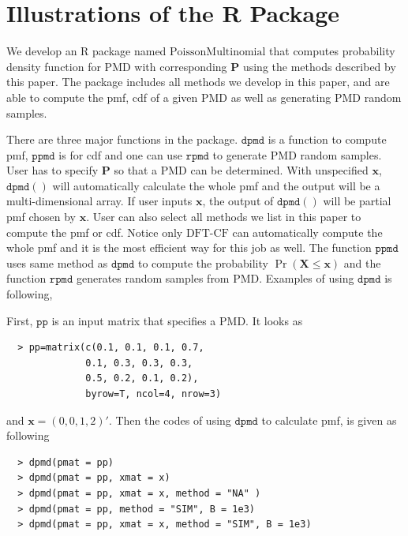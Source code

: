 \documentclass[12pt]{article}
\newcommand{\Pmat}{\mathbf{P}}
\newcommand{\PMD}{\textrm{PMD}}
\newcommand{\Xvec}{\boldsymbol{X}}
\newcommand{\xvec}{\boldsymbol{x}}
\newcommand{\code}{\texttt}
\newcommand{\dft}{{\textrm{DFT-CF}}}
\begin{document}
\section{Illustrations of the R Package}\label{sec:rpackage}
We develop an R package named $\textrm{PoissonMultinomial}$ that computes probability density function for $\PMD$ with corresponding $\Pmat$ using the methods described by this paper. The package includes all methods we develop in this paper, and are able to compute the pmf, cdf of a given $\PMD$ as well as generating $\PMD$ random samples.

There are three major functions in the package. $\code{dpmd}$ is a function to compute pmf, $\code{ppmd}$ is for cdf and one can use $\code{rpmd}$ to generate $\PMD$ random samples. User has to specify $\Pmat$ so that a $\PMD$ can be determined. With unspecified $\xvec$, $\code{dpmd}( )$ will automatically calculate the whole pmf and the output will be a multi-dimensional array. If user inputs $\xvec$, the output of $\code{dpmd}( )$ will be partial pmf chosen by $\xvec$. User can also select all methods we list in this paper to compute the pmf or cdf. Notice only $\dft$ can automatically compute the whole pmf and it is the most efficient way for this job as well. The function $\code{ppmd}$ uses same method as $\code{dpmd}$ to compute the probability $\Pr(\Xvec \leq \xvec)$ and the function $\code{rpmd}$ generates random samples from $\PMD$.  Examples of using $\code{dpmd}$ is following,

First, $\code{pp}$ is an input matrix that specifies a $\PMD$. It looks as
\begin{verbatim}
  > pp=matrix(c(0.1, 0.1, 0.1, 0.7,
              0.1, 0.3, 0.3, 0.3,
              0.5, 0.2, 0.1, 0.2),
              byrow=T, ncol=4, nrow=3)
\end{verbatim}
and $\xvec=(0,0,1,2)'$. Then the codes of using $\code{dpmd}$ to calculate pmf, is given as following
\begin{verbatim}
  > dpmd(pmat = pp)
  > dpmd(pmat = pp, xmat = x)
  > dpmd(pmat = pp, xmat = x, method = "NA" )
  > dpmd(pmat = pp, method = "SIM", B = 1e3)
  > dpmd(pmat = pp, xmat = x, method = "SIM", B = 1e3)
\end{verbatim}
\end{document}
